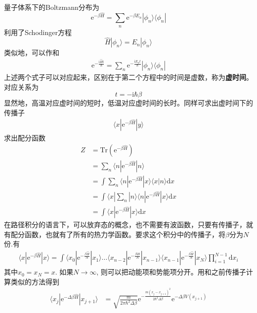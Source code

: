 \documentclass[12pt]{article}
\begin{document}
量子体系下的Boltzmann分布为
\begin{equation*}
    \mathrm{e}^{-\beta \hat{H}} = \sum_n \mathrm{e}^{-\beta E_n} |\phi_n \rangle \langle \phi_n|
\end{equation*}
利用了Schodinger方程
\begin{equation*}
    \hat{H} |\phi_n \rangle = E_n |\phi_n \rangle
\end{equation*}
类似地，可以作和
\begin{align*}
    \mathrm{e}^{-\frac {\mathrm{i}\hat{H}t}{\hbar}} = \sum_n \mathrm{e}^{-\frac {\mathrm{i}E_n t}{\hbar}} |\phi_n \rangle \langle \phi_n|
\end{align*}
上述两个式子可以对应起来，区别在于第二个方程中的时间是虚数，称为\textbf{虚时间}。对应关系为
\begin{equation*}
    t = -\mathrm{i}\hbar \beta
\end{equation*}
显然地，高温对应虚时间的短时，低温对应虚时间的长时。同样可求出虚时间下的传播子
\begin{align*}
    \langle x|\mathrm{e}^{-\beta \hat{H}}|y\rangle
\end{align*}
求出配分函数
\begin{align*}
    Z &= \mathrm{Tr}(\mathrm{e}^{-\beta \hat{H}}) \\
    &= \sum_n \langle n| \mathrm{e}^{-\beta \hat{H}}|n\rangle \\
    &= \int \sum_n \langle n| \mathrm{e}^{-\beta \hat{H}}|x \rangle \langle x|n\rangle \mathrm{d}x\\
    &= \int \langle x|\sum_n|n \rangle \langle n| \mathrm{e}^{-\beta \hat{H}}|x\rangle \mathrm{d}x\\
    &= \int \langle x|\mathrm{e}^{-\beta \hat{H}}|x\rangle \mathrm{d}x
\end{align*}
在路径积分的语言下，可以放弃态的概念，也不需要有波函数，只要有传播子，就有配分函数，也就有了所有的热力学函数。要求这个积分中的传播子，将$\beta$分为$N$份.有
\begin{align*}
    \langle x|\mathrm{e}^{-\beta \hat{H}}|x\rangle  = \int \langle x_0|\mathrm{e}^{-\frac {\beta \hat{H}}N} |x_1 \rangle ... \langle x_{n-2}|\mathrm{e}^{-\frac {\beta \hat{H}}N} |x_{n-1} \rangle \langle x_{n-1}|\mathrm{e}^{-\frac {\beta \hat{H}}N} |x_N \rangle \prod_{i=1}^{N-1}\mathrm{d}x_i
\end{align*}
其中$x_0=x_N = x$. 如果$N \to \infty$, 则可以把动能项和势能项分开。用和之前传播子计算类似的方法得到
\begin{align*}
    \langle x_j|\mathrm{e}^{-\Delta \beta \hat{H}} |x_{j+1} \rangle &= \sqrt{\frac m{2\pi \hbar^2 \Delta \beta}} \mathrm{e}^{-\frac {m(x_j- x_{j+1})^2}{2\hbar^2 \Delta \beta}} \mathrm{e}^{-\Delta \beta V(x_{j+1})}
\end{align*}
\end{document}
